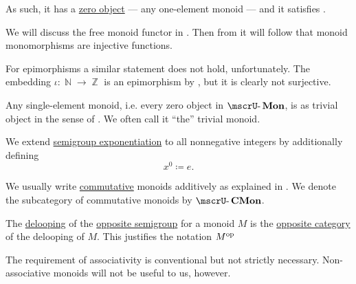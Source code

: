 \begin{definition}
\begin{thmenum}
    As such, it has a \hyperref[def:universal_objects/zero]{zero object} --- any one-element monoid --- and it satisfies .

    We will discuss the free monoid functor in . Then from  it will follow that monoid monomorphisms are injective functions.

    For epimorphisms a similar statement does not hold, unfortunately. The embedding \( \iota: \BbbN \to \BbbZ \) is an epimorphism by , but it is clearly not surjective.

     Any single-element monoid, i.e. every zero object in \( \ucat{Mon} \), is as trivial object in the sense of . We often call it \enquote{the} trivial monoid.

     We extend \hyperref[def:semigroup/exponentiation]{semigroup exponentiation} to all nonnegative integers by additionally defining
    \begin{equation*}
      x^0 \coloneqq e.
    \end{equation*}

     We usually write \hyperref[def:binary_operation/commutative]{commutative} monoids additively as explained in . We denote the subcategory of commutative monoids by \( \ucat{CMon} \).

     The \hyperref[def:monoid_delooping]{delooping} of the \hyperref[def:semigroup/opposite]{opposite semigroup} for a monoid \( M \) is the \hyperref[def:opposite_category]{opposite category} of the delooping of \( M \). This justifies the notation \( M^{\operatorname{op}} \)
  \end{thmenum}
\end{definition}
\begin{comments}
  \item The requirement of associativity is conventional but not strictly necessary. Non-associative monoids will not be useful to us, however.
\end{comments}

